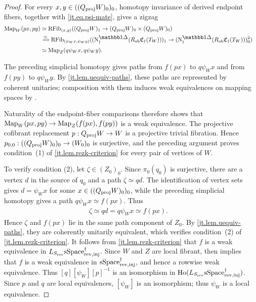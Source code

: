 \documentclass[a4paper,dvipdfmx,11pt]{amsart}
\begin{document}
\begin{proof}
  For every $x,y\in((Q_{\mathrm{proj}}W)_0)_0$, homotopy invariance of derived endpoint fibers, together with \eqref{jt.eq.psi-mate}, gives a zigzag
  \begin{align}
    \Map_W(px,py)
    &\simeq
    \RFib_{(x,y)}
    ((Q_{\proj}W)_1
      \to
      (Q_{\proj}W)_0\times(Q_{\proj}W)_0)\notag\\
    &\xrightarrow{\simeq}
    \RFib_{(\psi_Wx,\psi_Wy)}
    ((\N^{\prism}_{\dag}
        (R_{\rmob}\frakC_{\dag}(T_W)))_1
      \to
      (\N^{\prism}_{\dag}
        (R_{\rmob}\frakC_{\dag}(T_W)))_0^2)\notag\\
    &\simeq
    \Map_Z(q\psi_Wx,q\psi_Wy).
  \end{align}

  The preceding simplicial homotopy gives paths from $f(px)$ to $q\psi_Wx$ and from $f(py)$ to $q\psi_Wy$.
  By \cref{jt.lem.uequiv-paths}, these paths are represented by coherent unitaries;
  composition with them induces weak equivalences on mapping spaces by \cite[Corollary~11.5]{Rez01}.

  Naturality of the endpoint-fiber comparisons therefore shows that $\operatorname{Map}_W(px,py) \to \operatorname{Map}_Z(f(px),f(py))$ is a weak equivalence.
  The projective cofibrant replacement $p:Q_{\mathrm{proj}}W\to W$ is a projective trivial fibration.
  Hence $p_{0,0}:((Q_{\mathrm{proj}}W)_0)_0\to(W_0)_0$ is surjective, and the preceding argument proves condition~(1) of \cref{jt.lem.rezk-criterion} for every pair of vertices of $W$.

  To verify condition (2), let $\zeta\in(Z_0)_0$.
  Since $\pi_0(q_0)$ is surjective, there are a vertex $d$ in the source of $q_0$ and a path $\zeta\simeq qd$.
  The identification of vertex sets gives $d=\psi_Wx$ for some $x\in((Q_{\mathrm{proj}}W)_0)_0$, while the preceding simplicial homotopy gives a path $q\psi_Wx\simeq f(px)$.
  Thus
  \begin{align}
    \zeta
    \simeq
    qd
    =
    q\psi_Wx
    \simeq
    f(px).
  \end{align}
  Hence $\zeta$ and $f(px)$ lie in the same path component of $Z_0$.
  By \cref{jt.lem.uequiv-paths}, they are coherently unitarily equivalent, which verifies condition~(2) of \cref{jt.lem.rezk-criterion}.
  It follows from \cref{jt.lem.rezk-criterion} that $f$ is a weak equivalence in $L_{S_{\mathrm{rev}}}\mathrm{sSpace}^{\dag}_{\mathrm{rev},\mathrm{inj}}$.
  Since $W$ and $Z$ are local fibrant, \cite[Theorem~3.2.13 (1)]{Hir02} then implies that $f$ is a weak equivalence in $\mathrm{sSpace}^{\dag}_{\mathrm{rev},\mathrm{inj}}$, and hence a rowwise weak equivalence.
  Thus $[q][\psi_W][p]^{-1}$ is an isomorphism in $\mathrm{Ho} (L_{S_{\mathrm{rev}}}\mathrm{sSpace}^{\dag}_{\mathrm{rev},\mathrm{inj}})$.
  Since $p$ and $q$ are local equivalences, $[\psi_W]$ is an isomorphism;
  thus $\psi_W$ is a local equivalence.


\end{proof}
\end{document}
